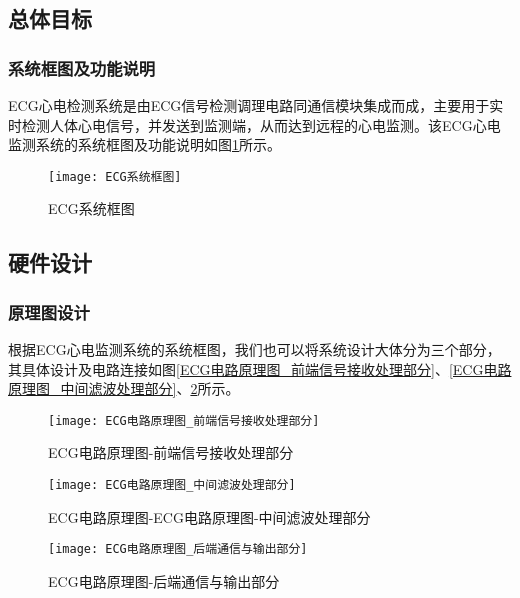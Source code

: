 \documentclass{zjureport}
\begin{document}
	\subsection{总体目标}
	
	\subsubsection{系统框图及功能说明}
	
	ECG心电检测系统是由ECG信号检测调理电路同通信模块集成而成，主要用于实时检测人体心电信号，并发送到监测端，从而达到远程的心电监测。该ECG心电监测系统的系统框图及功能说明如图\ref{ECG系统框图}所示。
	
	\begin{figure}[H]
		\centering%
		\texttt{[image: ECG系统框图]}
		\caption{ECG系统框图}%
		\label{ECG系统框图}%
	\end{figure}

	\newpage
	
	\subsection{硬件设计}
	
	\subsubsection{原理图设计}
	
	根据ECG心电监测系统的系统框图，我们也可以将系统设计大体分为三个部分，其具体设计及电路连接如图\ref{ECG电路原理图_前端信号接收处理部分}、\ref{ECG电路原理图_中间滤波处理部分}、\ref{ECG电路原理图_后端通信与输出部分}所示。
	
	\begin{figure}[H]
		\centering
		\begin{minipage}[t]{0.49\linewidth}%
			\texttt{[image: ECG电路原理图\_前端信号接收处理部分]}%
			\caption{ECG电路原理图-前端信号接收处理部分}
			\label{ECG电路原理图_前端信号接收处理部分}
		\end{minipage}%
		\begin{minipage}[t]{0.49\linewidth}
			\texttt{[image: ECG电路原理图\_中间滤波处理部分]}
			\caption{ECG电路原理图-ECG电路原理图-中间滤波处理部分}
			\label{ECG电路原理图_中间滤波处理部分}
		\end{minipage}
		
		\begin{minipage}[t]{0.49\linewidth}%
			\texttt{[image: ECG电路原理图\_后端通信与输出部分]}%
			\caption{ECG电路原理图-后端通信与输出部分}
			\label{ECG电路原理图_后端通信与输出部分}
		\end{minipage}%
	\end{figure}
\end{document}
